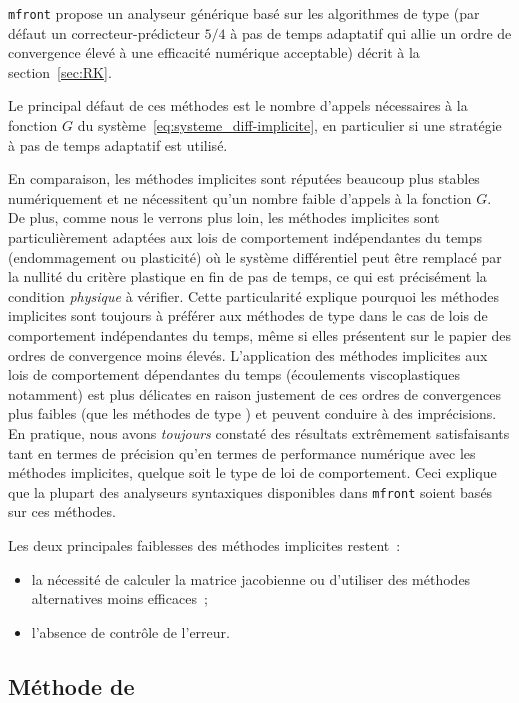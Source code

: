 \documentclass[rectoverso,pleiades,pstricks,leqno,anti]{texmf/note_technique_2010}
\newcommand{\mfront}{\texttt{mfront}}
\begin{document}
\mfront{} propose un analyseur générique basé sur les algorithmes de
type  (par défaut un correcteur-prédicteur \(5/4\) à
pas de temps adaptatif qui allie un ordre de convergence élevé à une
efficacité numérique acceptable) décrit à la section~\ref{sec:RK}.

Le principal défaut de ces méthodes est le nombre d'appels nécessaires à
la fonction \(G\) du système~\eqref{eq:systeme_diff-implicite}, en
particulier si une stratégie à pas de temps adaptatif est utilisé.

En comparaison, les méthodes implicites sont réputées beaucoup plus
stables numériquement et ne nécessitent qu'un nombre faible d'appels à
la fonction \(G\). De plus, comme nous le verrons plus loin, les
méthodes implicites sont particulièrement adaptées aux lois de
comportement indépendantes du temps (endommagement ou plasticité) où
le système différentiel peut être remplacé par la nullité du critère
plastique en fin de pas de temps, ce qui est précisément la condition
{\em physique} à vérifier. Cette particularité explique pourquoi les
méthodes implicites sont toujours à préférer aux méthodes de type
 dans le cas de lois de comportement indépendantes du
temps, même si elles présentent sur le papier des ordres de
convergence moins élevés.  L'application des méthodes implicites aux
lois de comportement dépendantes du temps (écoulements viscoplastiques
notamment) est plus délicates en raison justement de ces ordres de
convergences plus faibles (que les méthodes de type )
et peuvent conduire à des imprécisions. En pratique, nous avons {\em
  toujours} constaté des résultats extrêmement satisfaisants tant en
termes de précision qu'en termes de performance numérique avec les
méthodes implicites, quelque soit le type de loi de comportement. Ceci
explique que la plupart des analyseurs syntaxiques disponibles dans
\mfront{} soient basés sur ces méthodes.

Les deux principales faiblesses des méthodes implicites restent~:
\begin{itemize}
  \item la nécessité de calculer la matrice jacobienne ou d'utiliser des
  méthodes alternatives moins efficaces~;
  \item l'absence de contrôle de l'erreur.
\end{itemize}

\subsection{Méthode de }
\label{sec:NR}
\end{document}
